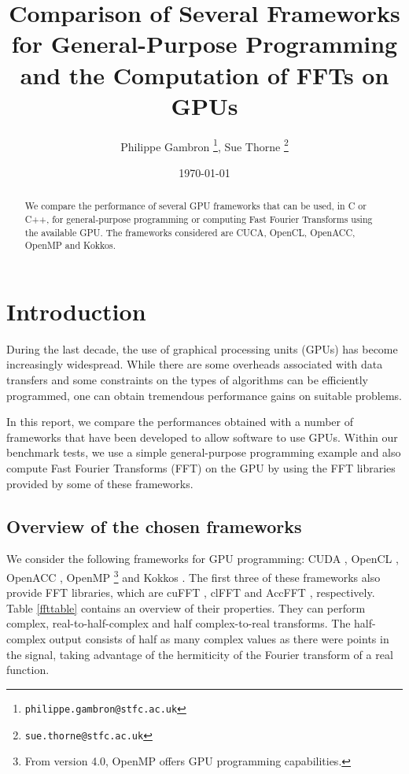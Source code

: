 \documentclass[12pt, a4paper]{article}
\date{}
\begin{document}
\title{Comparison of Several Frameworks for General-Purpose Programming and the  Computation of FFTs on GPUs}
\author{Philippe Gambron \thanks{\texttt{philippe.gambron{@}stfc.ac.uk}}, Sue Thorne \thanks{\texttt{sue.thorne{@}stfc.ac.uk}}}
\date{\today}
\maketitle
\begin{abstract}
We compare the performance of several GPU frameworks that can be used,
in C or C++, for general-purpose programming or computing Fast Fourier
Transforms using the available GPU. The frameworks considered are
CUCA, OpenCL, OpenACC, OpenMP and Kokkos.
\end{abstract}


\section{Introduction}
During the last decade, the use of graphical processing units (GPUs)
has become increasingly widespread.  While there are some overheads
associated with data transfers and some constraints
on the types of algorithms can be efficiently programmed, one can
obtain tremendous performance gains on suitable problems.

In this report, we compare the performances obtained with a number of
frameworks that have been developed to allow software to use GPUs.
Within our benchmark tests, we use a simple general-purpose programming
example and also compute Fast Fourier Transforms (FFT) on the GPU by
using the FFT libraries provided by some of these frameworks.

\subsection{Overview of the chosen frameworks}
We consider the following frameworks for GPU programming: CUDA
\cite{cuda}, OpenCL \cite{opencl}, \mbox{OpenACC} \cite{openacc},
OpenMP \cite{openmp}\footnote{From version 4.0, OpenMP offers GPU
  programming capabilities.} and Kokkos \cite{kokkos}. The first three
of these frameworks also provide FFT libraries, which are cuFFT
\cite{cufft}, clFFT \cite{clfft} and AccFFT \cite{accfft},
respectively. Table \ref{ffttable} contains an overview of their
properties. They can perform complex, real-to-half-complex
and half complex-to-real transforms. The half-complex output
consists of half as many complex values as there were points in the
signal, taking advantage of the hermiticity of the Fourier transform
of a real function.
\end{document}
